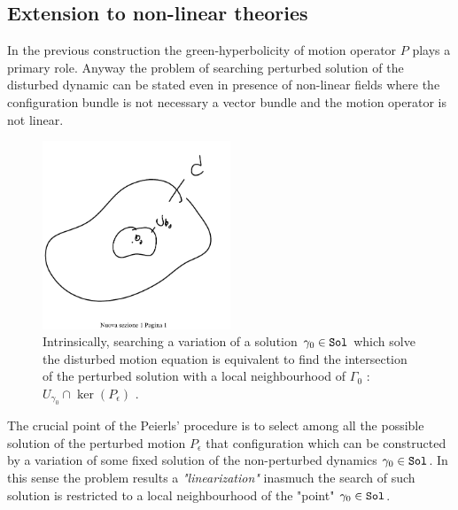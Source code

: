 \documentclass[Main]{subfiles}
\begin{document}
	\subsection{Extension to non-linear theories}
		In the previous construction the green-hyperbolicity of motion operator $P$ plays a primary role.
		Anyway the problem of searching perturbed solution of the disturbed dynamic can be stated even in presence  of non-linear fields  where the configuration bundle is not necessary a vector bundle and the motion operator is not linear.
		\begin{figure}[h!]
				  \centering
   	\includegraphics[width=0.5\textwidth]{Pictures/Linearization} 
   	  \caption{Intrinsically, searching a variation of a solution $\gamma_0\in \mathtt{Sol}$ which solve the disturbed motion equation is equivalent to find the intersection of the perturbed solution with a local neighbourhood of $\Gamma_0$ : $U_{\gamma_0}\cap\ker(P_\epsilon)$ .}
		\end{figure}		
		
		The crucial point of the Peierls' procedure  is to select among all the possible solution of the perturbed motion $P_\epsilon$ that configuration which can be constructed by a variation of some fixed solution of the non-perturbed dynamics $\gamma_0 \in \mathtt{Sol}$.
		In this sense the problem results a \emph{"linearization"} inasmuch the  search of such solution is restricted to a local neighbourhood of the "point" $\gamma_0\in \mathtt{Sol}$.
\end{document}
